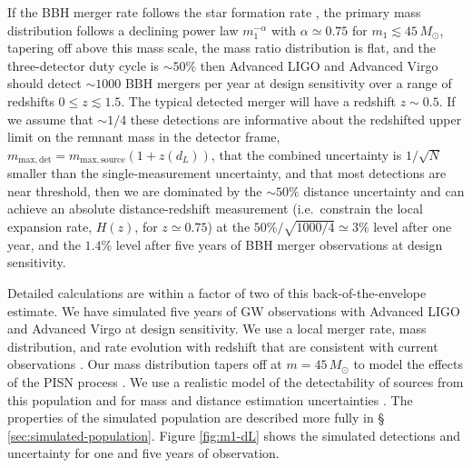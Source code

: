 \documentclass[modern]{aastex62}
\newcommand{\MPISN}{45 \, \MSun{}}
\newcommand{\MSun}{M_\odot}
\begin{document}
If the \ac{BBH} merger rate follows the star formation rate
\citep{Fishbach2018,O1O2Population}, the primary mass distribution follows a
declining power law $m_1^{-\alpha}$ with $\alpha \simeq 0.75$ for $m_1 \lesssim
\MPISN{}$, tapering off above this mass scale, the mass ratio distribution is
flat, and the three-detector duty cycle is $\sim 50\%$ then Advanced LIGO and
Advanced Virgo should detect $\sim 1000$ \ac{BBH} mergers per year at design
sensitivity over a range of redshifts $0 \leq z \lesssim 1.5$.  The typical
detected merger will have a redshift $z \sim 0.5$.  If we assume that $\sim
1/4$ these detections are informative about the redshifted upper limit on the
remnant mass in the detector frame, $m_\mathrm{max,det} = m_\mathrm{max,source}
\left(1 + z\left( d_L \right) \right)$, that the combined uncertainty is
$1/\sqrt{N}$ smaller than the single-measurement uncertainty, and that most
detections are near threshold, then we are dominated by the $\sim 50\%$ distance
uncertainty and can achieve an absolute distance-redshift measurement (i.e.\
constrain the local expansion rate, $H(z)$, for $z \simeq 0.75$) at the $50 \% /
\sqrt{1000/4} \simeq 3 \%$ level after one year, and the $1.4 \%$ level after
five years of \ac{BBH} merger observations at design sensitivity.

Detailed calculations are within a factor of two of this back-of-the-envelope
estimate.  We have simulated five years of \ac{GW} observations with Advanced
LIGO and Advanced Virgo at design sensitivity.  We use a local merger rate, mass
distribution, and rate evolution with redshift that are consistent with current
observations \citep{Fishbach2017,Fishbach2018,O1O2Population}.  Our mass
distribution tapers off at $m = \MPISN{}$ to model the effects of the \ac{PISN}
process \citep{Belczynski2016}.  We use a realistic model of the detectability
of sources from this population \citep{GW150914Rate,GW150914RateSupplement} and
for mass and distance estimation uncertainties \citep{Vitale2017}.  The
properties of the simulated population are described more fully in \S
\ref{sec:simulated-population}.  Figure \ref{fig:m1-dL} shows the simulated
detections and uncertainty for one and five years of observation.
\end{document}
